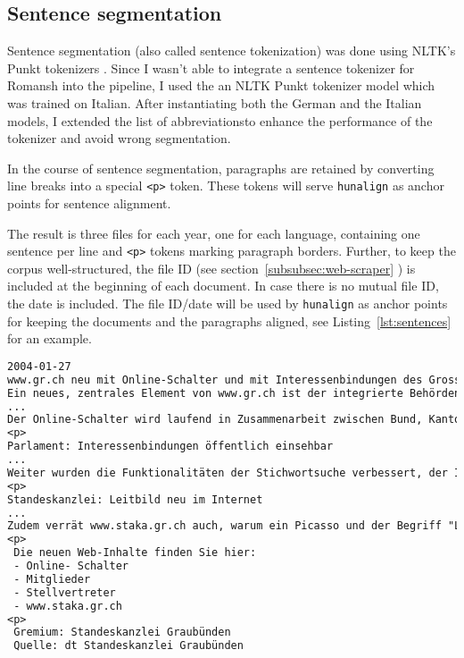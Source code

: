 \subsection{Sentence segmentation}
Sentence segmentation (also called sentence tokenization) was done using NLTK's Punkt tokenizers \autocite{bird-2009-nltk}. 
Since I wasn't able to integrate a sentence tokenizer for Romansh into the pipeline, I used the an NLTK Punkt tokenizer model which was trained on Italian. 
After instantiating both the German and the Italian models, I extended the list of abbreviations\footnotemark to enhance the performance of the tokenizer and avoid wrong segmentation. 


In the course of sentence segmentation, paragraphs are retained by converting line breaks into a special \texttt{<p>} token. 
These tokens will serve \texttt{hunalign} as anchor points for sentence alignment.

The result is three files for each year, one for each language, containing one sentence per line and \texttt{<p>} tokens marking paragraph borders. 
Further, to keep the corpus well-structured, the file ID (see section~\ref{subsubsec:web-scraper} ) is included at the beginning of each document. 
In case there is no mutual file ID, the date is included. 
The file ID/date will be used by \texttt{hunalign} as anchor points for keeping the documents and the paragraphs aligned, see Listing~\ref{lst:sentences} for an example.

\vspace{0.5cm}

\begin{lstlisting}[language=txt, caption={[Excerpt from a file containing sentences for alignment.]Excerpt from a  file containing sentences for alignment. 
In order to keep the file structured and increase alignment performance, each document starts with a date and paragraph are boundaries are marked with a special \texttt{<p>} token.}, captionpos=t, label={lst:sentences}]
2004-01-27
www.gr.ch neu mit Online-Schalter und mit Interessenbindungen des Grossen Rats
Ein neues, zentrales Element von www.gr.ch ist der integrierte Behörden-Online-Schalter www.ch.ch.
...
Der Online-Schalter wird laufend in Zusammenarbeit zwischen Bund, Kantonen und Gemeinden weiterentwickelt und inhaltlich erweitert.
<p>
Parlament: Interessenbindungen öffentlich einsehbar 
...
Weiter wurden die Funktionalitäten der Stichwortsuche verbessert, der Informationsgehalt im Bereich "Unser Kanton" erweitert ("Produkte aus Graubünden", Suchmaschine für Graubünden) sowie der Sprachenwechsel zwischen den Inhalten in deutsch, romanisch und italienisch vereinfacht.
<p>
Standeskanzlei: Leitbild neu im Internet 
...
Zudem verrät www.staka.gr.ch auch, warum ein Picasso und der Begriff "Light" ohne weiteres mit der Standeskanzlei Graubünden in Zusammenhang gebracht werden können.
<p>
 Die neuen Web-Inhalte finden Sie hier: 
 - Online- Schalter 
 - Mitglieder 
 - Stellvertreter
 - www.staka.gr.ch 
<p>
 Gremium: Standeskanzlei Graubünden 
 Quelle: dt Standeskanzlei Graubünden
\end{lstlisting}

